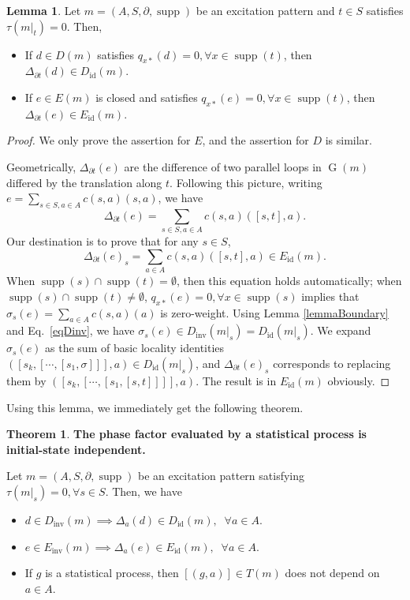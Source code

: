 \documentclass[reprint, amsmath, amssymb, showpacs, floatfix, longbibliography, aps, twocolumn, superscriptaddress, nofootinbib]{revtex4-2}
\newcommand{\supp}{\operatorname{supp}}
\newcommand{\id}{{\operatorname{id}}}
\newcommand{\inv}{{\operatorname{inv}}}
\theoremstyle{definition}
\newtheorem{theorem}{Theorem}[section]
\newtheorem{lemma}{Lemma}[section]
\begin{document}
\begin{lemma}\label{lemmaTranslation}
	Let $m=(A,S,\partial,\supp)$ be an excitation pattern and $t\in S$ satisfies $\tau(m|_t)=0$. Then, 
	\begin{itemize}
		\item If $d\in D(m)$ satisfies $q_{x*}(d)=0,\forall x\in\supp(t)$, then $\Delta_{\partial t}(d)\in D_\id(m)$.
		\item If $e\in E(m)$ is closed and satisfies $q_{x*}(e)=0,\forall x\in\supp(t)$, then $\Delta_{\partial t}(e)\in E_\id(m)$.
	\end{itemize}
\end{lemma}
\begin{proof}
	We only prove the assertion for $E$, and the assertion for $D$ is similar. 
	
	 Geometrically, $\Delta_{\partial t}(e)$ are the difference of two parallel loops in $\operatorname{G}(m)$ differed by the translation along $t$. Following this picture, writing $e=\sum_{s\in S,a\in A}c(s,a)(s,a)$, we have
	\begin{equation}
		\Delta_{\partial t}(e)=\sum_{s\in S,a\in A}c(s,a)([s,t],a).
	\end{equation}
	Our destination is to prove that for any $s\in S$,
	\begin{equation}
		\Delta_{\partial t}(e)_s=\sum_{a\in A}c(s,a)([s,t],a)\in E_\id(m).
	\end{equation}
	When $\supp(s)\cap\supp(t)=\emptyset$, then this equation holds automatically; when $\supp(s)\cap\supp(t)\ne\emptyset$,
	$q_{x*}(e)=0,\forall x\in \supp(s)$ implies that $\sigma_s(e)=\sum_{a\in A}c(s,a)(a)$ is zero-weight. Using Lemma \ref{lemmaBoundary} and Eq.~\eqref{eqDinv}, we have $\sigma_s(e)\in D_\inv(m|_s)=D_\id(m|_s)$.	
	We expand $\sigma_s(e)$ as the sum of basic locality identities $([s_k,[\cdots,[s_1,\sigma]]],a)\in D_\id(m|_s)$, and $\Delta_{\partial t}(e)_s$ corresponds to replacing them by $([s_k,[\cdots,[s_1,[s,t]]]],a)$. The result is in $ E_\id(m)$ obviously. 
\end{proof}
Using this lemma, we immediately get the following theorem.
\begin{theorem}\label{thmInitialStateIndependence}
	\textbf{The phase factor evaluated by a statistical process is initial-state independent.}
	
	Let $m=(A,S,\partial,\supp)$ be an excitation pattern satisfying $\tau(m|_s)=0, \forall s\in S$. Then, we have
	\begin{itemize}
		\item $d\in D_\inv(m)\implies \Delta_a(d)\in D_\id(m),\;\;\forall a\in A$. 
		\item $e\in E_\inv(m)\implies \Delta_a(e)\in E_\id(m),\;\;\forall a\in A$. 
		\item If $g$ is a statistical process, then $[(g,a)]\in T(m)$ does not depend on $a\in A$.
	\end{itemize}
\end{theorem}
\end{document}
